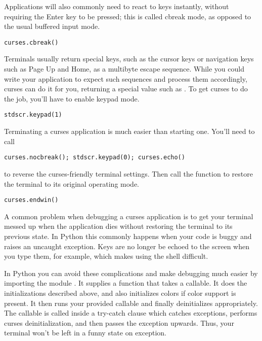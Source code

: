 \documentclass{howto}
\begin{document}
Applications will also commonly need to react to keys instantly,
without requiring the Enter key to be pressed; this is called cbreak
mode, as opposed to the usual buffered input mode.

\begin{verbatim}
curses.cbreak()
\end{verbatim}

Terminals usually return special keys, such as the cursor keys or
navigation keys such as Page Up and Home, as a multibyte escape
sequence.  While you could write your application to expect such
sequences and process them accordingly, curses can do it for you,
returning a special value such as .  To get
curses to do the job, you'll have to enable keypad mode.

\begin{verbatim}
stdscr.keypad(1)
\end{verbatim}

Terminating a curses application is much easier than starting one.
You'll need to call 

\begin{verbatim}
curses.nocbreak(); stdscr.keypad(0); curses.echo()
\end{verbatim}

to reverse the curses-friendly terminal settings. Then call the
 function to restore the terminal to its original
operating mode.

\begin{verbatim}
curses.endwin()
\end{verbatim}

A common problem when debugging a curses application is to get your
terminal messed up when the application dies without restoring the
terminal to its previous state.  In Python this commonly happens when
your code is buggy and raises an uncaught exception.  Keys are no
longer be echoed to the screen when you type them, for example, which
makes using the shell difficult.

In Python you can avoid these complications and make debugging much
easier by importing the module .  It supplies a
 function that takes a callable.  It does the
initializations described above, and also initializes colors if color
support is present.  It then runs your provided callable and finally
deinitializes appropriately.  The callable is called inside a try-catch
clause which catches exceptions, performs curses deinitialization, and
then passes the exception upwards.  Thus, your terminal won't be left
in a funny state on exception.
\end{document}
